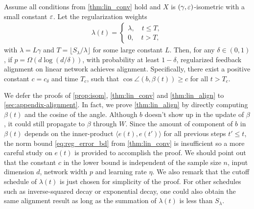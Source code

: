 \begin{theorem}
\label{thm:lin_align}
Assume all conditions from \cref{thm:lin_conv} hold and $X$ is $(\gamma, \varepsilon)$-isometric with a small constant $\varepsilon$. Let the regularization weights
\begin{align*}
\lambda(t) = 
\begin{cases}
    \lambda, \quad t\leq T,\\
    0, \quad t > T,
\end{cases}
\end{align*}
with $\lambda=L\gamma$ and $T = \lfloor S_\lambda/\lambda\rfloor$ for some large constant $L$. Then, for any $\delta\in(0,1)$, if $p = \Omega(d\log(d/\delta))$, with probability at least $1-\delta$, regularized feedback alignment on linear network achieves alignment. Specifically, there exist a positive constant $c=c_\delta$ and time $T_c$, such that $\cos\angle(b, \beta(t))\geq c$ for all $t>T_c$.
\end{theorem}

We defer the proofs of \cref{prop:isom}, \cref{thm:lin_conv} and \cref{thm:lin_align} to \cref{sec:appendix-alignment}. In fact, we prove \cref{thm:lin_align} by directly computing $\beta(t)$ and the cosine of the angle. Although $b$ doesn't show up in the update of $\beta$, it could still propagate to $\beta$ through $W$. Since the amount of component of $b$ in $\beta(t)$ depends on the inner-product $\langle e(t), e(t')\rangle$ for all previous steps $t'\leq t$, the norm bound \eqref{eq:reg_error_bd} from \cref{thm:lin_conv} is insufficient so a more careful study on $e(t)$ is provided to accomplish the proof. We should point out that the constant $c$ in the lower bound is independent of the sample size $n$, input dimension $d$, network width $p$ and learning rate $\eta$. We also remark that the cutoff schedule of $\lambda(t)$ is just chosen for simplicity of the proof. For other schedules such as inverse-squared decay or exponential decay, one could also obtain the same alignment result as long as the summation of $\lambda(t)$ is less than $S_\lambda$.

